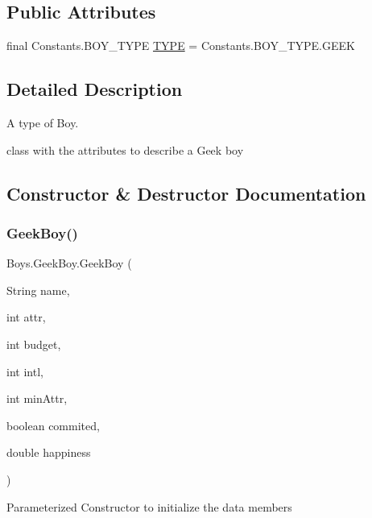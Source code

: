 \subsection*{Public Attributes}
\begin{DoxyCompactItemize}
\item 
final Constants.\+B\+O\+Y\+\_\+\+T\+Y\+PE \hyperlink{class_boys_1_1_geek_boy_a9cb339dc2c7e5dc53a126078d87e5ad2}{T\+Y\+PE} = Constants.\+B\+O\+Y\+\_\+\+T\+Y\+P\+E.\+G\+E\+EK
\end{DoxyCompactItemize}


\subsection{Detailed Description}
A type of Boy. 

class with the attributes to describe a Geek boy 

\subsection{Constructor \& Destructor Documentation}
\mbox{\label{class_boys_1_1_geek_boy_af4cd91eca301401560b4fea07a555446}} 
\subsubsection{\texorpdfstring{Geek\+Boy()}{GeekBoy()}\hspace{0.1cm}{\footnotesize\ttfamily [1/2]}}
{\footnotesize\ttfamily Boys.\+Geek\+Boy.\+Geek\+Boy (\begin{DoxyParamCaption}\item[{String}]{name,  }\item[{int}]{attr,  }\item[{int}]{budget,  }\item[{int}]{intl,  }\item[{int}]{min\+Attr,  }\item[{boolean}]{commited,  }\item[{double}]{happiness }\end{DoxyParamCaption})\hspace{0.3cm}{\ttfamily [inline]}}

Parameterized Constructor to initialize the data members \mbox{\label{class_boys_1_1_geek_boy_a94ce2920fde16a726f93c8ed371a6076}} 

